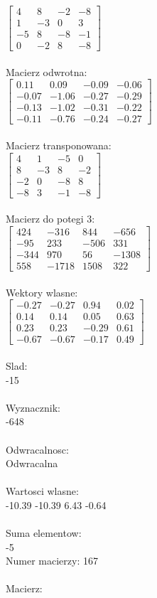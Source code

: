 \documentclass[a4paper,12pt]{article}
\begin{document}
$\begin{bmatrix} 4&8&-2&-8\\1&-3&0&3\\-5&8&-8&-1\\0&-2&8&-8 \end{bmatrix}$
\\
\\
Macierz odwrotna:\\

$\begin{bmatrix} 0.11&0.09&-0.09&-0.06\\-0.07&-1.06&-0.27&-0.29\\-0.13&-1.02&-0.31&-0.22\\-0.11&-0.76&-0.24&-0.27 \end{bmatrix}$
\\
\\
Macierz transponowana:\\

$\begin{bmatrix} 4&1&-5&0\\8&-3&8&-2\\-2&0&-8&8\\-8&3&-1&-8 \end{bmatrix}$
\\
\\
Macierz do potegi 3:\\

$\begin{bmatrix} 424&-316&844&-656\\-95&233&-506&331\\-344&970&56&-1308\\558&-1718&1508&322 \end{bmatrix}$
\\
\\
Wektory wlasne:\\

$\begin{bmatrix} -0.27&-0.27&0.94&0.02\\0.14&0.14&0.05&0.63\\0.23&0.23&-0.29&0.61\\-0.67&-0.67&-0.17&0.49 \end{bmatrix}$
\\
\\
Slad:\\
-15
\\
\\
Wyznacznik:\\
-648
\\
\\
Odwracalnosc:\\
Odwracalna
\\
\\
Wartosci wlasne:\\
-10.39 -10.39 6.43 -0.64
\\
\\
Suma elementow:\\
-5
\\
\newpage
Numer macierzy:
167
\\
\\
Macierz:\\
\end{document}
